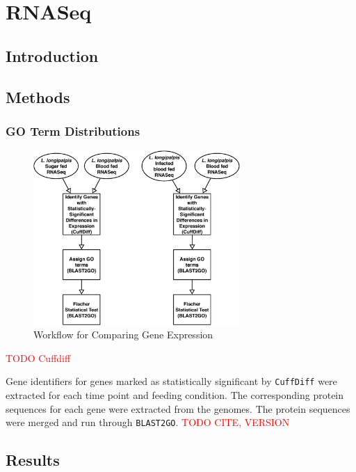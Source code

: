 \section{RNASeq}

\subsection{Introduction}

\subsection{Methods}

\subsubsection{GO Term Distributions}

\begin{figure}[H]
  \centering
  \includegraphics[width=0.7\textwidth]{figures/rnaseq/cuffdiff_workflow}
  \caption{Workflow for Comparing Gene Expression}
  \label{fig:rnaseq-cuffdiff-workflow}
\end{figure}

\textcolor{red}{TODO Cuffdiff}

Gene identifiers for genes marked as statistically significant by \texttt{CuffDiff} were extracted for each time point and feeding condition.  The corresponding protein sequences for each gene were extracted from the genomes.  The protein sequences were merged and run through \texttt{BLAST2GO}. \textcolor{red}{TODO CITE, VERSION}

\subsection{Results}

